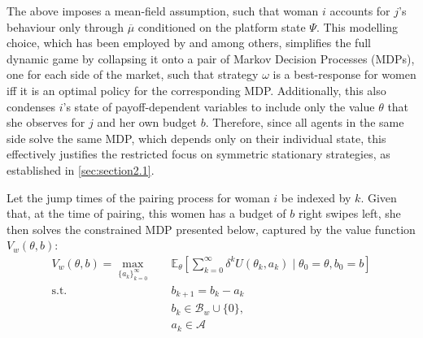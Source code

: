 The above imposes a mean-field assumption, such that woman $i$ accounts for $j$'s behaviour only through $\overline\mu$ conditioned on the platform state $\Psi$.
This modelling choice, which has been employed by \cite{immorlica2021designing} and \cite{iyer2014mean} among others, simplifies the full dynamic game by collapsing it onto a pair of Markov Decision Processes (MDPs), one for each side of the market, such that strategy $\omega$ is a best-response for women iff it is an optimal policy for the corresponding MDP. 
Additionally, this also condenses $i$'s state of payoff-dependent variables to include only the value $\theta$ that she observes for $j$ and her own budget $b$. 
Therefore, since all agents in the same side solve the same MDP, which depends only on their individual state, this effectively justifies the restricted focus on symmetric stationary strategies, as established in \autoref{sec:section2.1}.

Let the jump times of the pairing process for woman $i$ be indexed by $k$. 
Given that, at the time of pairing, this women has a budget of $b$ right swipes left, she then solves the constrained MDP presented below, captured by the value function $V_w(\theta,b)$: 
\begin{equation*}
    \begin{aligned} 
        V_w(\theta,b)=\max_{\{a_k\}^\infty_{k=0}} \quad & \mathbb{E}_{\theta}\left[\sum^\infty_{k=0} \delta^{k} U(\theta_k, a_k) \;|\; \theta_0=\theta, b_0=b\right]\\ 
        \textrm{s.t.} \quad & b_{k+1} = b_k -a_k \\
        & b_k\in \mathcal{B}_w \cup \{0\},\\
        & a_k\in \mathcal{A}  
    \end{aligned}
\end{equation*}

